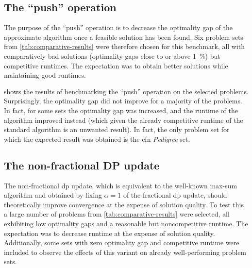 \subsection{The \enquote{push} operation}
The purpose of the \enquote{push} operation is to decrease the optimality gap of the approximate algorithm once a feasible solution has been found.
Six problem sets from \cref{tab:comparative-results} were therefore chosen for this benchmark, all with comparatively bad solutions (optimality gaps close to or above \SI{1}{\percent}) but competitive runtimes.
The expectation was to obtain better solutions while maintaining good runtimes.

 shows the results of benchmarking the \enquote{push} operation on the selected problems.
Surprisingly, the optimality gap did not improve for a majority of the problems.
In fact, for some sets the optimality gap was increased, and the runtime of the algorithm improved instead (which given the already competitive runtime of the standard algorithm is an unwanted result).
In fact, the only problem set for which the expected result was obtained is the \gls{cfn} \emph{Pedigree} set.

\subsection{The non-fractional DP update}
The non-fractional \gls{dp} update, which is equivalent to the well-known max-sum algorithm and obtained by fixing \(\alpha=1\) of the fractional \gls{dp} update, should theoretically improve convergence at the expense of solution quality.
To test this a large number of problems from \cref{tab:comparative-results} were selected, all exhibiting low optimality gaps and a reasonable but noncompetitive runtime.
The expectation was to decrease runtime at the expense of solution quality.
Additionally, some sets with zero optimality gap and competitive runtime were included to observe the effects of this variant on already well-performing problem sets.

